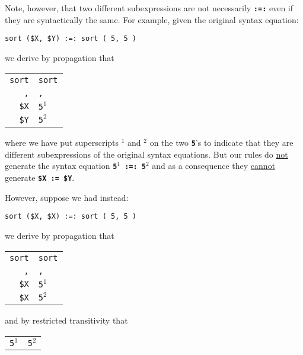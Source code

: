 \documentclass[12pt]{article}
\newcommand{\TT}[1]{{\tt \bfseries #1}}
\begin{document}
Note, however, that two different subexpressions
are not necessarily \TT{:=:} even if they are syntactically the same.
For example, given the original syntax equation:

\begin{center}
\verb/sort ($X, $Y) :=: sort ( 5, 5 )/
\end{center}

we derive by propagation that

\begin{center}
\begin{tabular}{r@\TT{~:=:~}l}
\verb/sort/ & \verb/sort/ \\
\verb/,/ & \verb/,/ \\
\verb/$X/ & \verb/5/$^1$ \\
\verb/$Y/ & \verb/5/$^2$ \\
\end{tabular}
\end{center}

where we have put superscripts $^1$ and $^2$ on the two \TT{5}'s to
indicate that they are different subexpressions of the original
syntax equations.  But our rules do \underline{not}
generate the syntax equation \TT{5$^1$ :=: 5$^2$} and as a consequence
they \underline{cannot} generate \TT{\$X := \$Y}.

However, suppose we had instead:

\begin{center}
\verb/sort ($X, $X) :=: sort ( 5, 5 )/
\end{center}

we derive by propagation that

\begin{center}
\begin{tabular}{r@\TT{~:=:~}l}
\verb/sort/ & \verb/sort/ \\
\verb/,/ & \verb/,/ \\
\verb/$X/ & \verb/5/$^1$ \\
\verb/$X/ & \verb/5/$^2$ \\
\end{tabular}
\end{center}

and by restricted transitivity that

\begin{center}
\begin{tabular}{r@\TT{~:=:~}l}
\verb/5/$^1$ & \verb/5/$^2$ \\
\end{tabular}
\end{center}
\end{document}
